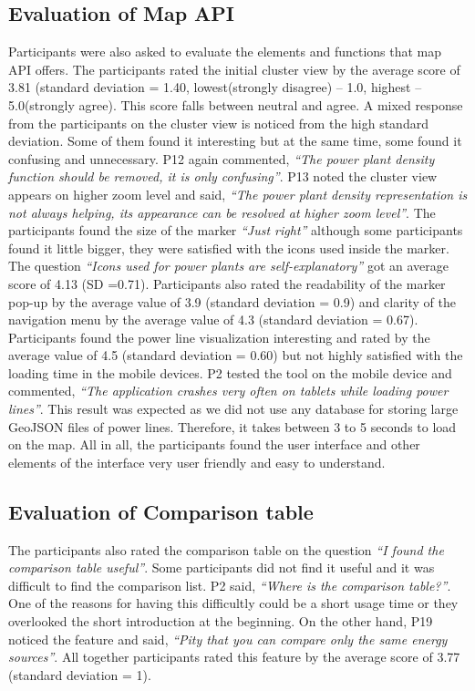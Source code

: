 \subsection*{Evaluation of Map API}

Participants were also asked to evaluate the elements and functions that map API offers. The participants rated the initial cluster view by the average score of 3.81 (standard deviation = 1.40, lowest(strongly disagree) – 1.0, highest – 5.0(strongly agree). This score falls between neutral and agree. A mixed response from the participants on the cluster view is noticed from the high standard deviation. Some of them found it interesting but at the same time, some found it confusing and unnecessary. P12 again commented, \textit{“The power plant density function should be removed, it is only confusing”}. P13 noted the cluster view appears on higher zoom level and said, \textit{“The power plant density representation is not always helping, its appearance can be resolved at higher zoom level”}. The participants found the size of the marker \textit{“Just right”} although some participants found it little bigger, they were satisfied with the icons used inside the marker. The question \textit{“Icons used for power plants are self-explanatory”} got an average score of 4.13 (SD =0.71). Participants also rated the readability of the marker pop-up by the average value of 3.9 (standard deviation = 0.9) and clarity of the navigation menu by the average value of 4.3 (standard deviation = 0.67). Participants found the power line visualization interesting and rated by the average value of 4.5 (standard deviation = 0.60) but not highly satisfied with the loading time in the mobile devices. P2 tested the tool on the mobile device and commented, \textit{“The application crashes very often on tablets while loading power lines”}. This result was expected as we did not use any database for storing large GeoJSON files of power lines. Therefore, it takes between 3 to 5 seconds to load on the map. All in all, the participants found the user interface and other elements of the interface very user friendly and easy to understand.

\subsection*{Evaluation of Comparison table}

The participants also rated the comparison table on the question \textit{“I found the comparison table useful”}. Some participants did not find it useful and it was difficult to find the comparison list.  P2 said, \textit{“Where is the comparison table?”}. One of the reasons for having this difficultly could be a short usage time or they overlooked the short introduction at the beginning. On the other hand, P19 noticed the feature and said, \textit{“Pity that you can compare only the same energy sources”}. All together participants rated this feature by the average score of 3.77 (standard deviation = 1).

